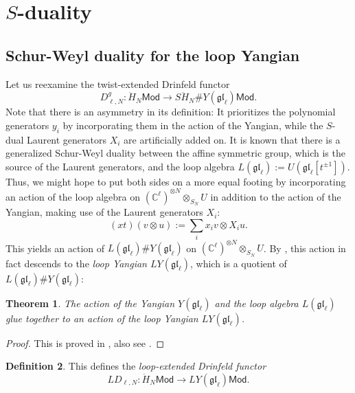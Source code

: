 \documentclass[11pt]{report}
\newtheorem{theorem}{Theorem}[section]
\theoremstyle{definition}
\newtheorem{definition}[theorem]{Definition}
\theoremstyle{remark}
\theoremstyle{remark}
\newcommand{\C}{\mathbb{C}}
\begin{document}
\section{$S$-duality}

\subsection{Schur-Weyl duality for the loop Yangian}

Let us reexamine the twist-extended Drinfeld functor
\begin{equation*}
D_{\ell,N}^g: \ddot H_N\mathsf{Mod} \to S\ddot H_N \# Y(\mathfrak{gl}_\ell) \mathsf{Mod}.
\end{equation*}
Note that there is an asymmetry in its definition: It prioritizes the polynomial generators $y_i$ by incorporating them in the action of the Yangian, while the $S$-dual Laurent generators $X_i$ are artificially added on. It is known that there is a generalized Schur-Weyl duality between the affine symmetric group, which is the source of the Laurent generators, and the loop algebra $L(\mathfrak{gl}_\ell) := U(\mathfrak{gl}_\ell[t^{\pm 1}])$. Thus, we might hope to put both sides on a more equal footing by incorporating an action of the loop algebra on $(\C^\ell)^{\otimes N} \otimes_{S_N} U$ in addition to the action of the Yangian, making use of the Laurent generators $X_i$:
\begin{equation*}
(x t)(v \otimes u) := \sum_i x_i v \otimes X_i u.
\end{equation*}
This yields an action of $L(\mathfrak{gl}_\ell) \# Y(\mathfrak{gl}_\ell)$ on $(\C^\ell)^{\otimes N} \otimes_{S_N} U$. By \cite{article:guay:2005}, this action in fact descends to the \emph{loop Yangian $LY(\mathfrak{gl}_\ell)$}, which is a quotient of $L(\mathfrak{gl}_\ell) \# Y(\mathfrak{gl}_\ell)$:

\begin{theorem}
The action of the Yangian $Y(\mathfrak{gl}_\ell)$ and the loop algebra $L(\mathfrak{gl}_\ell)$ glue together to an action of the loop Yangian $LY(\mathfrak{gl}_\ell)$.
\end{theorem}

\begin{proof}
This is proved in \cite{article:guay:2005}, also see \cite{article:kodera:2016}.
\end{proof}

\begin{definition}
This defines the \emph{loop-extended Drinfeld functor}
\begin{equation*}
LD_{\ell,N}: \ddot H_N\mathsf{Mod} \to LY(\mathfrak{gl}_\ell) \mathsf{Mod}.
\end{equation*}
\end{definition}
\end{document}
